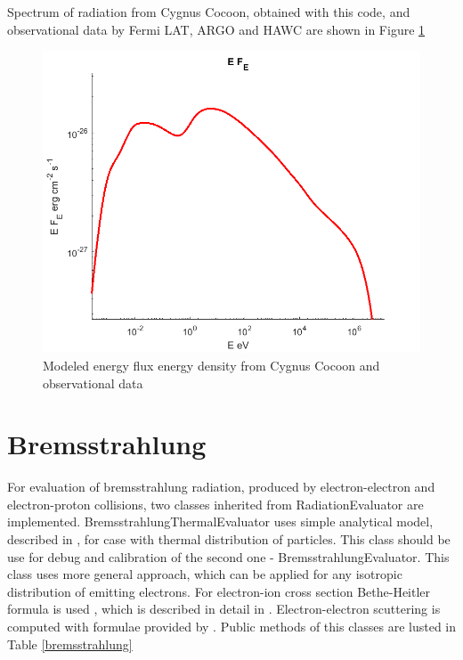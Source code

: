 Spectrum of radiation from Cygnus Cocoon, obtained with this code, and observational data by Fermi LAT, ARGO and HAWC \cite{Ackermann2011, Bartoli2014, Abeysekara2021} are shown in Figure \ref{pion}
\begin{figure}
	\centering
	\includegraphics[width=12.5 cm]{./fig/compton.png} 
	\caption{Modeled energy flux energy density from Cygnus Cocoon and observational data}
	\label{pion}
\end{figure}

\section{Bremsstrahlung}

For evaluation of bremsstrahlung radiation, produced by electron-electron and electron-proton collisions, two classes inherited from RadiationEvaluator are implemented. BremsstrahlungThermalEvaluator uses simple analytical model, described in \cite{Rybicki}, for case with thermal distribution of particles. This class should be use for debug and calibration of the second one - BremsstrahlungEvaluator. This class uses more general approach, which can be applied for any isotropic distribution of emitting electrons. For electron-ion cross section Bethe-Heitler formula is used \cite{BetheHeitler}, which is described in detail in \cite{JauchRohrlich}. Electron-electron scuttering is computed with formulae provided by \cite{Baring1999}. Public methods of this classes are lusted in Table \ref{bremsstrahlung}

